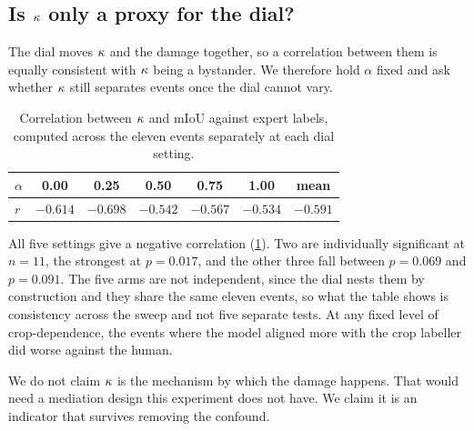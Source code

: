 \subsection{Is $\kappa$ only a proxy for the dial?}

The dial moves $\kappa$ and the damage together, so a correlation between them is
equally consistent with $\kappa$ being a bystander. We therefore hold $\alpha$ fixed
and ask whether $\kappa$ still separates events once the dial cannot vary.

\begin{table}[tb]
\centering
\small
\setlength{\tabcolsep}{3pt}
\begin{tabular}{lcccccc}
\toprule
$\alpha$ & 0.00 & 0.25 & 0.50 & 0.75 & 1.00 & mean \\
\midrule
$r$ & $-0.614$ & $-0.698$ & $-0.542$ & $-0.567$ & $-0.534$ & $\mathbf{-0.591}$ \\
\bottomrule
\end{tabular}
\caption{Correlation between $\kappa$ and mIoU against expert labels, computed across
the eleven events separately at each dial setting.}
\label{tab:fixed}
\end{table}

All five settings give a negative correlation (\cref{tab:fixed}). Two are
individually significant at $n = 11$, the strongest at $p = 0.017$, and the other
three fall between $p = 0.069$ and $p = 0.091$. The five arms are not independent,
since the dial nests them by construction and they share the same eleven events, so
what the table shows is consistency across the sweep and not five separate tests. At
any fixed level of crop-dependence, the events where the model aligned more with the
crop labeller did worse against the human.

We do not claim $\kappa$ is the mechanism by which the damage happens. That would need
a mediation design this experiment does not have. We claim it is an indicator that
survives removing the confound.
